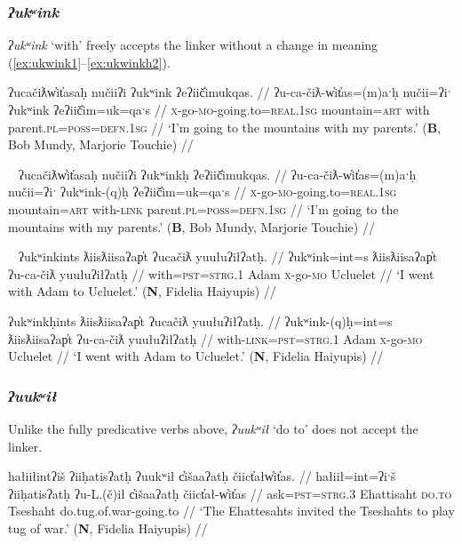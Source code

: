 \subsubsection{\textit{ʔukʷink}} \label{ch:link:ukwink} \textit{ʔukʷink} `with' freely accepts the linker without a change in meaning (\ref{ex:ukwink1}--\ref{ex:ukwinkh2}).

\ex \label{ex:ukwink1}
\begingl
\glpreamble ʔucačiƛw̓it̓asaḥ nučiiʔi ʔukʷink ʔeʔiič̓imukqas. //
\gla ʔu-ca-čiƛ-w̓it̓as=(m)aˑḥ nučii=ʔiˑ ʔukʷink ʔeʔiič̓im=uk=qaˑs //
\glb \textsc{x}-go-\textsc{mo}-going.to=\textsc{real.1sg} mountain=\textsc{art} with parent.\textsc{pl}=\textsc{poss}=\textsc{defn.1sg} //
\glft `I'm going to the mountains with my parents.' (\textbf{B}, Bob Mundy, Marjorie Touchie) //
\endgl
\xe

\ex~ \label{ex:ukwinkh1}
\begingl
\glpreamble ʔucačiƛw̓it̓asaḥ nučiiʔi ʔukʷinkḥ ʔeʔiič̓imukqas. //
\gla ʔu-ca-čiƛ-w̓it̓as=(m)aˑḥ nučii=ʔiˑ ʔukʷink-(q)ḥ ʔeʔiič̓im=uk=qaˑs //
\glb \textsc{x}-go-\textsc{mo}-going.to=\textsc{real.1sg} mountain=\textsc{art} with-\textsc{link} parent.\textsc{pl}=\textsc{poss}=\textsc{defn.1sg} //
\glft `I'm going to the mountains with my parents.' (\textbf{B}, Bob Mundy, Marjorie Touchie) //
\endgl
\xe

\ex~ \label{ex:ukwink2}
\begingl
\glpreamble ʔukʷinkints ƛiisƛiisaʔap̓t ʔucačiƛ yuułuʔiłʔatḥ. //
\gla ʔukʷink=int=s ƛiisƛiisaʔap̓t ʔu-ca-čiƛ yuułuʔiłʔatḥ //
\glb with=\textsc{pst}=\textsc{strg.1} Adam \textsc{x}-go-\textsc{mo} Ucluelet //
\glft `I went with Adam to Ucluelet.' (\textbf{N}, Fidelia Haiyupis) //
\endgl
\xe

\ex \label{ex:ukwinkh2}
\begingl
\glpreamble ʔukʷinkḥints ƛiisƛiisaʔap̓t ʔucačiƛ yuułuʔiłʔatḥ. //
\gla ʔukʷink-(q)ḥ=int=s ƛiisƛiisaʔap̓t ʔu-ca-čiƛ yuułuʔiłʔatḥ //
\glb with-\textsc{link}=\textsc{pst}=\textsc{strg.1} Adam \textsc{x}-go-\textsc{mo} Ucluelet //
\glft `I went with Adam to Ucluelet.' (\textbf{N}, Fidelia Haiyupis) //
\endgl
\xe

\subsubsection{\textit{ʔuukʷił}} \label{ch:link:uukwil} Unlike the fully predicative verbs above, \textit{ʔuukʷił} `do to' does not accept the linker.

\ex \label{ex:tugofwar1}
\begingl
\glpreamble hałiiłintʔiš ʔiiḥatisʔatḥ ʔuukʷił c̓išaaʔatḥ čiict̓ałw̓it̓as. //
\gla hałiił=int=ʔiˑš ʔiiḥatisʔatḥ ʔu-L.(č)ił c̓išaaʔatḥ čiict̓ał-w̓it̓as //
\glb ask=\textsc{pst}=\textsc{strg.3} Ehattisaht \textsc{do.to} Tseshaht do.tug.of.war-going.to //
\glft `The Ehattesahts invited the Tseshahts to play tug of war.' (\textbf{N}, Fidelia Haiyupis) //
\endgl
\xe

